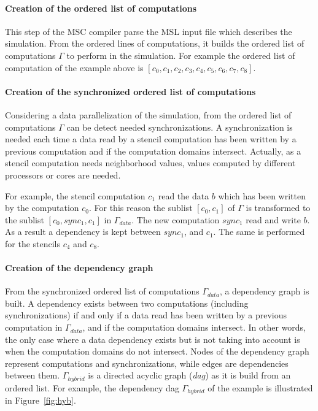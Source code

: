 \paragraph{Creation of the ordered list of computations} This step of the MSC compiler parse the MSL input file which describes the simulation. From the ordered lines of computations, it builds the ordered list of computations $\Gamma$ to perform in the simulation. For example the ordered list of computation of the example above is $[c_0,c_1,c_2,c_3,c_4,c_5,c_6,c_7,c_8]$.

\paragraph{Creation of the synchronized ordered list of computations} Considering a data parallelization of the simulation, from the ordered list of computations $\Gamma$ can be detect needed synchronizations. A synchronization is needed each time a data read by a stencil computation has been written by a previous computation and if the computation domains intersect. Actually, as a stencil computation needs neighborhood values, values computed by different processors or cores are needed.

For example, the stencil computation $c_1$ read the data $b$ which has been written by the computation $c_0$. For this reason the sublist $[c_0,c_1]$ of $\Gamma$ is transformed to the sublist $[c_0,sync_1,c_1]$ in $\Gamma_{data}$. The new computation $sync_1$ read and write $b$. As a result a dependency is kept between $sync_1$, and $c_1$. The same is performed for the stencils $c_4$ and $c_8$.

\paragraph{Creation of the dependency graph} From the synchronized ordered list of computations $\Gamma_{data}$, a dependency graph is built. A dependency exists between two computations (including synchronizations) if and only if a data read has been written by a previous computation in $\Gamma_{data}$, and if the computation domains intersect. In other words, the only case where a data dependency exists but is not taking into account is when the computation domains do not intersect. Nodes of the dependency graph represent computations and synchronizations, while edges are dependencies between them. $\Gamma_{hybrid}$ is a directed acyclic graph (\emph{dag}) as it is build from an ordered list. For example, the dependency dag $\Gamma_{hybrid}$ of the example is illustrated in Figure~\ref{fig:hyb}.

